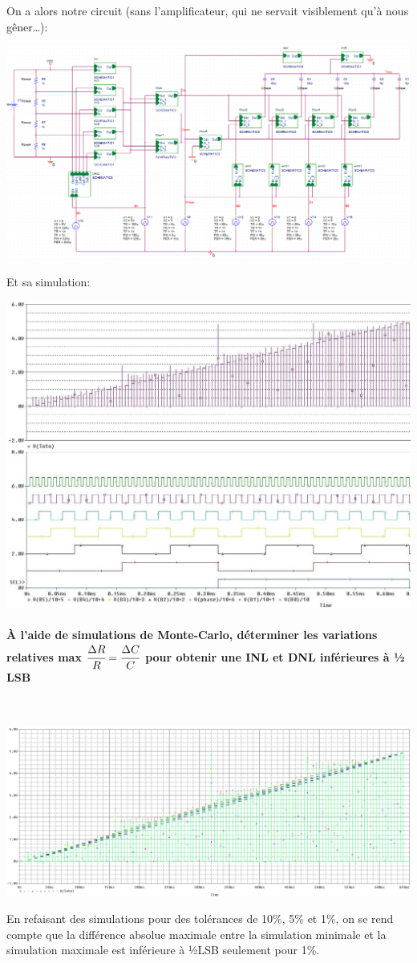 \documentclass{article}
\begin{document}
\newpage

On a alors notre circuit (sans l’amplificateur, qui ne servait visiblement qu’à nous gêner…):

\includegraphics[width=\linewidth]{becancna/circuit.png}

Et sa simulation:

\includegraphics[width=\linewidth]{becancna/convertisseur.jpg}

\newpage

\paragraph{À l’aide de simulations de Monte-Carlo, déterminer les variations relatives max $\cfrac{\Delta R}{R} = \cfrac{\Delta C}{C}$ pour obtenir une INL et DNL inférieures à ½ LSB}

~

\includegraphics[width=\linewidth]{becancna/monte_carlo.png}


En refaisant des simulations pour des tolérances de 10\%, 5\% et 1\%, on se rend compte que la différence absolue maximale entre la simulation minimale et la simulation maximale est inférieure à ½LSB seulement pour 1\%.
\end{document}
